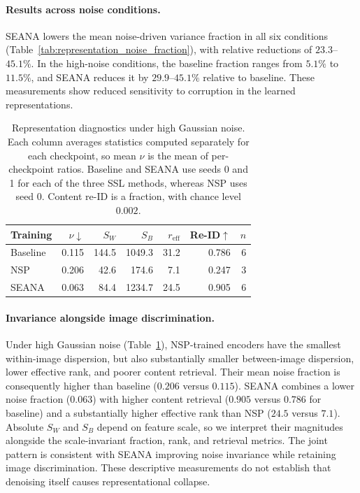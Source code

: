 \paragraph{Results across noise conditions.}
SEANA lowers the mean noise-driven variance fraction in all six conditions
(Table~\ref{tab:representation_noise_fraction}), with relative reductions of
$23.3$--$45.1\%$. In the high-noise conditions, the baseline fraction ranges
from $5.1\%$ to $11.5\%$, and SEANA reduces it by $29.9$--$45.1\%$ relative
to baseline. These measurements show reduced sensitivity to corruption in
the learned representations.

\begin{table}[t]
    \centering
    \small
    \setlength{\tabcolsep}{5pt}
    \caption{Representation diagnostics under high Gaussian noise. Each column
    averages statistics computed separately for each checkpoint, so mean $\nu$
    is the mean of per-checkpoint ratios. Baseline and SEANA use seeds 0 and 1
    for each of the three SSL methods, whereas NSP uses seed 0. Content re-ID
    is a fraction, with chance level $0.002$.}
    \label{tab:representation_gaussian_high}
    \begin{tabular}{lrrrrrr}
        \toprule
        Training & $\nu\downarrow$ & $S_W$ & $S_B$
                 & $r_{\mathrm{eff}}$ & Re-ID$\uparrow$ & $n$ \\
        \midrule
        Baseline & 0.115 & 144.5 & 1049.3 & 31.2 & 0.786 & 6 \\
        NSP      & 0.206 &  42.6 &  174.6 &  7.1 & 0.247 & 3 \\
        SEANA    & 0.063 &  84.4 & 1234.7 & 24.5 & 0.905 & 6 \\
        \bottomrule
    \end{tabular}
\end{table}

\paragraph{Invariance alongside image discrimination.}
Under high Gaussian noise (Table~\ref{tab:representation_gaussian_high}),
NSP-trained encoders have the smallest within-image dispersion, but also
substantially smaller between-image dispersion, lower effective rank, and
poorer content retrieval. Their mean noise fraction is consequently higher
than baseline ($0.206$ versus $0.115$). SEANA combines a lower noise fraction
($0.063$) with higher content retrieval ($0.905$ versus $0.786$ for baseline)
and a substantially higher effective rank than NSP ($24.5$ versus $7.1$).
Absolute $S_W$ and $S_B$ depend on feature scale, so we interpret their magnitudes
alongside the scale-invariant fraction, rank, and retrieval metrics. The joint
pattern is consistent with SEANA improving noise invariance while retaining
image discrimination. These descriptive measurements do not establish that
denoising itself causes representational collapse.

